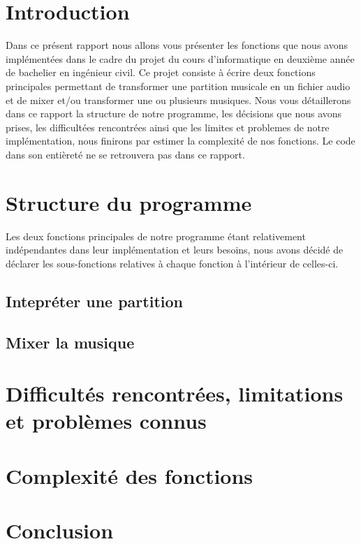 \documentclass[a4paper,12pt]{report}
\begin{document}
\section{Introduction}
Dans ce présent rapport nous allons vous présenter les fonctions que nous avons implémentées dans le cadre du projet du cours d'informatique en deuxième année de bachelier en ingénieur civil. Ce projet consiste à écrire deux fonctions principales permettant de transformer une partition musicale en un fichier audio et de mixer et/ou transformer une ou plusieurs musiques. Nous vous détaillerons dans ce rapport la structure de notre programme, les décisions que nous avons prises, les difficultées rencontrées ainsi que les limites et problemes de notre implémentation, nous finirons par estimer la complexité de nos fonctions. Le code dans son entièreté ne se retrouvera pas dans ce rapport.

\section{Structure du programme}
Les deux fonctions principales de notre programme étant relativement indépendantes dans leur implémentation et leurs besoins, nous avons décidé de déclarer les sous-fonctions relatives à chaque fonction à l'intérieur de celles-ci.
\subsection{Intepréter une partition}

\subsection{Mixer la musique}


\section{Difficultés rencontrées, limitations et problèmes connus}
\section{Complexité des fonctions}

\section{Conclusion}
\end{document}
